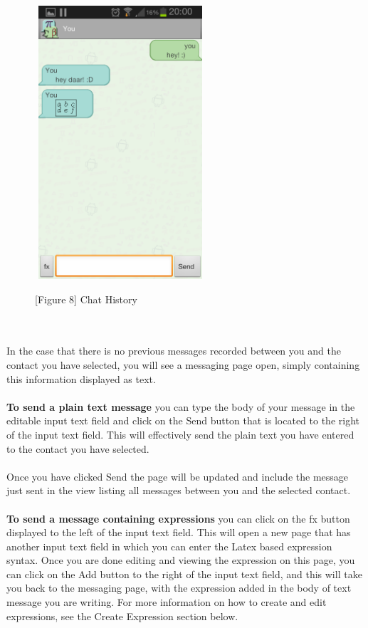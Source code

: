 \documentclass[29pt,a4paper]{moderncv}
\begin{document}
				\noindent\begin{figure}
				\centering
				\includegraphics[width=2.5in, height=4.0in]{./Screenshot_2013-10-23-20-00-45.png} \\
				\centering \caption{[Figure 8] Chat History}
				\end{figure}\\
				
				\\In the case that there is no previous messages recorded between you and the contact you have selected, you will see a messaging page open, simply containing this information displayed as text.\\
				
			\\	\textbf{To send a plain text message} you can type the body of your message in the editable input text field and click on the Send button that is located to the right of the input text field. This will effectively send the plain text you have entered to the contact you have selected.\\  
				
				\\Once you have clicked Send the page will be updated and include the message just sent in the view listing all messages between you and the selected contact.\\
				
			\\	\textbf{To send a message containing expressions} you can click on the fx button displayed to the left of the input text field.  This will open a new page that has another input text field in which you can enter the Latex based expression syntax. Once you are done editing and viewing the expression on this page, you can click on the Add button to the right of the input text field, and this will take you back to the messaging page, with the expression added in the body of text message you are writing. For more information on how to create and edit expressions, see the Create Expression section below.\\
				\vspace{4mm}
				
\end{document}
